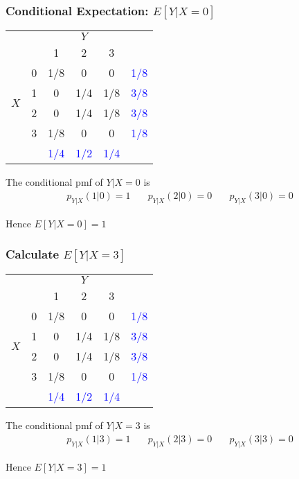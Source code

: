 \begin{frame}
	\frametitle{Conditional Expectation: $E[Y|X=0]$}

\footnotesize
\begin{table}
\begin{tabular}{|cc|ccc|c|}
\hline
&&\multicolumn{3}{c|}{$Y$}&\\
&&1 & 2&3&\\
\hline
\multirow{4}{*}{$X$}
&0& \multicolumn{1}{|c}{\alert{1/8}} & \alert{0}& \alert{0}&\textcolor{blue}{1/8}\\
&1& \multicolumn{1}{|c}{\alert{0}} & \alert{1/4}&\alert{1/8}&\textcolor{blue}{3/8}\\
&2& \multicolumn{1}{|c}{\alert{0}} & \alert{1/4}&\alert{1/8}&\textcolor{blue}{3/8}\\
&3& \multicolumn{1}{|c}{\alert{1/8}} & \alert{0}&\alert{0}&\textcolor{blue}{1/8}\\
\hline
&&\textcolor{blue}{1/4}&\textcolor{blue}{1/2}&\textcolor{blue}{1/4}&\\
\hline
\end{tabular}
\end{table}

The conditional pmf of $Y|X=0$ is 
	$$\boxed{\begin{array}{ccc}p_{Y|X}(1|0) =1 \quad&p_{Y|X}(2|0) =0 \quad&p_{Y|X}(3|0) =0\end{array}}$$
	

\alert{Hence $E[Y|X=0] = 1$}

\end{frame}
\begin{frame}
	\frametitle{Calculate $E[Y|X=3]$}

\footnotesize
\begin{table}
\begin{tabular}{|cc|ccc|c|}
\hline
&&\multicolumn{3}{c|}{$Y$}&\\
&&1 & 2&3&\\
\hline
\multirow{4}{*}{$X$}
&0& \multicolumn{1}{|c}{\alert{1/8}} & \alert{0}& \alert{0}&\textcolor{blue}{1/8}\\
&1& \multicolumn{1}{|c}{\alert{0}} & \alert{1/4}&\alert{1/8}&\textcolor{blue}{3/8}\\
&2& \multicolumn{1}{|c}{\alert{0}} & \alert{1/4}&\alert{1/8}&\textcolor{blue}{3/8}\\
&3& \multicolumn{1}{|c}{\alert{1/8}} & \alert{0}&\alert{0}&\textcolor{blue}{1/8}\\
\hline
&&\textcolor{blue}{1/4}&\textcolor{blue}{1/2}&\textcolor{blue}{1/4}&\\
\hline
\end{tabular}
\end{table}


The conditional pmf of $Y|X=3$ is
	$$\boxed{\begin{array}{ccc}p_{Y|X}(1|3) =1 \quad&p_{Y|X}(2|3) =0 \quad&p_{Y|X}(3|3) =0\end{array}}$$
	
\alert{Hence $E[Y|X=3] = 1$}

\end{frame}
